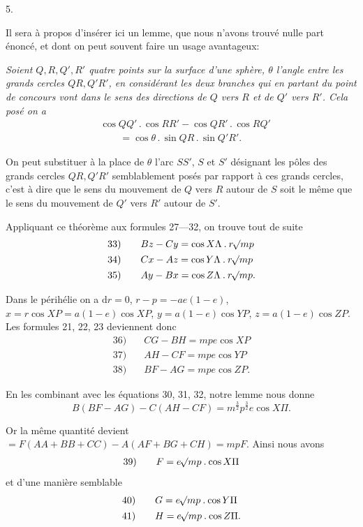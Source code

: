\par{}\bigskip
{}
\begin{center}5.\end{center}
\noindent\hspace*{\parindent}Il sera à propos d’insérer ici un lemme, que nous n’avons trouvé nulle part énoncé, et dont on peut souvent faire un usage avantageux:
\par\textit{Soient \(Q,R,Q',R'\) quatre points sur la surface d’une sphère, \(\theta\) l’angle entre les grands cercles \(QR,Q'R'\), en considérant les deux branches qui en partant du point de concours vont dans le sens des directions de \(Q\) vers \(R\) et de \(Q'\) vers \(R'\). Cela posé on a}
\[
\begin{aligned}
&\cos QQ'\mathbin{.}\cos RR'-\cos QR'\mathbin{.}\cos RQ'\\
&\qquad=\cos\theta\mathbin{.}\sin QR\mathbin{.}\sin Q'R'.
\end{aligned}
\]
\par On peut substituer à la place de \(\theta\) l’arc \(SS'\), \(S\) et \(S'\) désignant les pôles des grands cercles \(QR,Q'R'\) semblablement posés par rapport à ces grands cercles, c’est à dire que le sens du mouvement de \(Q\) vers \(R\) autour de \(S\) soit le même que le sens du mouvement de \(Q'\) vers \(R'\) autour de \(S'\).
\par Appliquant ce théorème aux formules 27—32, on trouve tout de suite
\[
\begin{array}{rl}
33)\quad&Bz-Cy=\cos X\Lambda\mathbin{.}r\mathord{{}^{}\!\surd}mp\\[4pt]
34)\quad&Cx-Az=\cos Y\Lambda\mathbin{.}r\mathord{{}^{}\!\surd}mp\\[4pt]
35)\quad&Ay-Bx=\cos Z\Lambda\mathbin{.}r\mathord{{}^{}\!\surd}mp.
\end{array}
\]
\par Dans le périhélie on a \(\mathrm{d}r=0\), \(r-p=-ae(1-e)\), \(x=r\cos XP=a(1-e)\cos XP\), \(y=a(1-e)\cos YP\), \(z=a(1-e)\cos ZP\). Les formules 21, 22, 23 deviennent donc
\[
\begin{array}{rl}
36)\quad&CG-BH=mpe\cos XP\\[4pt]
37)\quad&AH-CF=mpe\cos YP\\[4pt]
38)\quad&BF-AG=mpe\cos ZP.
\end{array}
\]
\par En les combinant avec les équations 30, 31, 32, notre lemme nous donne
\[
B(BF-AG)-C(AH-CF)=m^{\frac32}p^{\frac32}e\cos X\Pi.
\]
\par Or la même quantité devient \(=F(AA+BB+CC)-A(AF+BG+CH)=mpF\). Ainsi nous avons
\[
\begin{array}{rl}39)\quad&F=e\mathord{{}^{}\!\surd}mp\mathbin{.}\cos X\Pi\end{array}
\]
et d’une manière semblable
\[
\begin{array}{rl}
40)\quad&G=e\mathord{{}^{}\!\surd}mp\mathbin{.}\cos Y\Pi\\[4pt]
41)\quad&H=e\mathord{{}^{}\!\surd}mp\mathbin{.}\cos Z\Pi.
\end{array}
\]
